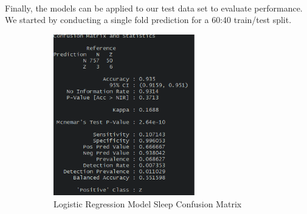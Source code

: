 \documentclass{article}
\begin{document}
\paragraph{}
Finally, the models can be applied to our test data set to evaluate performance.  We started by conducting a single fold prediction for a 60:40 train/test split.  

\begin{figure}[H]
\begin{subfigure}[b]{0.5\linewidth}
	\includegraphics[width=\linewidth]
	{Images/Linear_model_sleep_cm.png}
	\caption{Logistic Regression Model Sleep Confusion Matrix}
\end{subfigure}
\begin{subfigure}[b]{0.5\linewidth}

\end{subfigure}
\end{figure}
\end{document}
